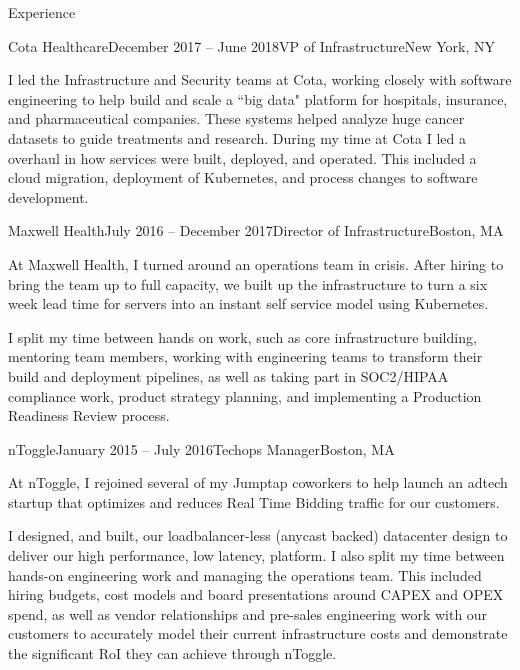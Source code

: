 \documentclass{resume} %
\begin{document}
\begin{rSection}{Experience}
\begin{rSubsection}{Cota Healthcare}{December 2017 -- June 2018}{VP of Infrastructure}{New York, NY}
\item[] I led the Infrastructure and Security teams at Cota, working closely with
  software engineering to help build and scale a ``big data" platform for hospitals,
  insurance, and pharmaceutical companies.  These systems helped analyze huge cancer
  datasets to guide treatments and research.  During my time at Cota I led a overhaul
  in how services were built, deployed, and operated.  This included a cloud migration,
  deployment of Kubernetes, and process changes to software development.
\end{rSubsection}

\begin{rSubsection}{Maxwell Health}{July 2016 -- December 2017}{Director of Infrastructure}{Boston, MA}
\item[] At Maxwell Health, I turned around an operations team in crisis.  After
  hiring to bring the team up to full capacity, we built up the infrastructure
  to turn a six week lead time for servers into an instant self service model
  using Kubernetes.

I split my time between hands on work, such as core infrastructure building,
  mentoring team members, working with engineering teams to transform their
  build and deployment pipelines, as well as taking part in SOC2/HIPAA
  compliance work, product strategy planning, and implementing a Production
  Readiness Review process.
\end{rSubsection}

\begin{rSubsection}{nToggle}{January 2015 -- July 2016}{Techops Manager}{Boston, MA}

\item[] At nToggle, I rejoined several of my Jumptap coworkers to help launch
  an adtech startup that optimizes and reduces Real Time Bidding traffic for
  our customers.

I designed, and built, our loadbalancer-less (anycast backed) datacenter design
  to deliver our high performance, low latency, platform.  I also split my time between hands-on engineering work and managing the operations
  team.  This included hiring budgets, cost models and board presentations
  around CAPEX and OPEX spend, as well as vendor relationships and pre-sales
  engineering work with our customers to accurately model their current
  infrastructure costs and demonstrate the significant RoI they can achieve
  through nToggle.


\end{rSubsection}
\end{rSection}
\end{document}
